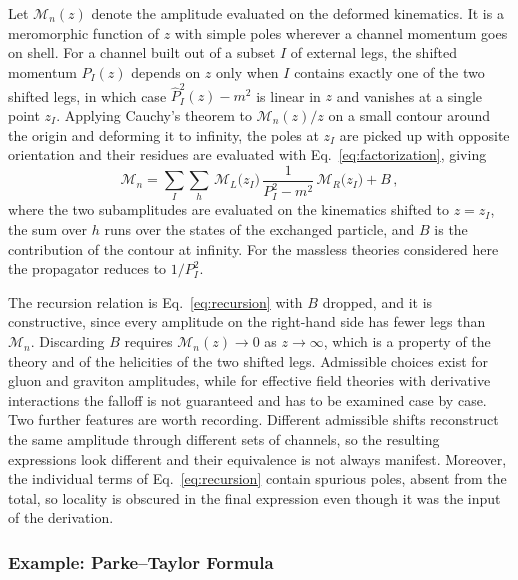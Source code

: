Let $\mathcal M_n(z)$ denote the amplitude evaluated on the deformed kinematics. It is a meromorphic
function of $z$ with simple poles wherever a channel momentum goes on shell. For a channel built out
of a subset $I$ of external legs, the shifted momentum $\widehat P_I(z)$ depends on $z$ only when $I$
contains exactly one of the two shifted legs, in which case $\widehat P_I^2(z)-m^2$ is linear in $z$ and
vanishes at a single point $z_I$. Applying Cauchy's theorem to $\mathcal M_n(z)/z$ on a small
contour around the origin and deforming it to infinity, the poles at $z_I$ are picked up with
opposite orientation and their residues are evaluated with Eq.~\eqref{eq:factorization}, giving
\begin{equation}\label{eq:recursion}
    \mathcal M_n = \sum_{I}\sum_{h}\,
    \mathcal M_{L}\big(z_I\big)\,\frac{1}{P_I^{2}-m^2}\,\mathcal M_{R}\big(z_I\big) + B\,,
\end{equation}
where the two subamplitudes are evaluated on the kinematics shifted to $z=z_I$, the sum over $h$
runs over the states of the exchanged particle, and $B$ is the contribution of the contour at
infinity. For the massless theories considered here the propagator reduces to $1/P_I^2$.

The recursion relation is Eq.~\eqref{eq:recursion} with $B$ dropped, and it is constructive, since
every amplitude on the right-hand side has fewer legs than $\mathcal M_n$. Discarding $B$ requires
$\mathcal M_n(z)\to0$ as $z\to\infty$, which is a property of the theory and of the helicities of the two
shifted legs. Admissible choices exist for gluon and graviton amplitudes, while for effective field
theories with derivative interactions the falloff is not guaranteed and has to be examined case by
case. Two further features are worth recording. Different admissible shifts reconstruct the same
amplitude through different sets of channels, so the resulting expressions look different and their
equivalence is not always manifest. Moreover, the individual terms of Eq.~\eqref{eq:recursion}
contain spurious poles, absent from the total, so locality is obscured in the final expression even
though it was the input of the derivation.

\subsubsection{Example: Parke--Taylor Formula}

